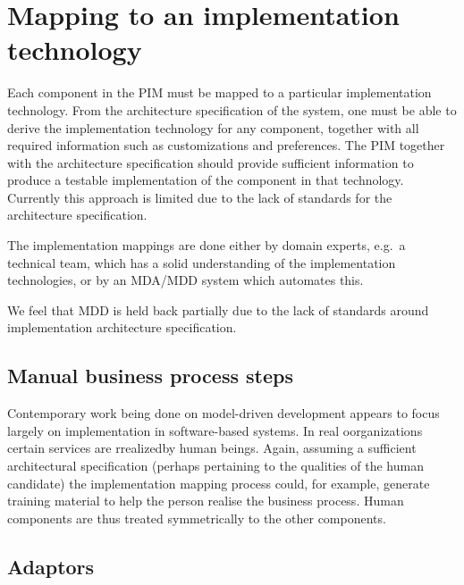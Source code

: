 \documentclass{IOS-Book-Article}
\begin{document}

\section{Mapping to an implementation technology}

Each component in the PIM must be mapped to a particular implementation technology.
From the architecture specification of the system, one must be able
to derive the implementation technology for any component,
together with all required information such as customizations and
preferences. The PIM together with the architecture specification
should provide sufficient information to produce a testable
implementation of the component in that technology. Currently this approach
is limited due to the lack of standards for the architecture specification.

The implementation mappings are done either by domain experts, e.g.\ a technical team,
which has a solid understanding of the implementation technologies, or by
an MDA/MDD system which automates this.

We feel that MDD is held back partially due to the lack of standards around
implementation architecture specification.


\subsection{Manual business process steps}

Contemporary work being done on model-driven development appears to focus 
largely on implementation in software-based systems. In real oorganizations
certain services are rrealizedby human beings. Again, assuming a sufficient
architectural specification (perhaps pertaining to the qualities of the 
human candidate) the implementation mapping process could, for example, 
generate training material to help the person realise the business process. 
Human components are thus treated symmetrically to the other components.


\subsection{Adaptors}
\end{document}
